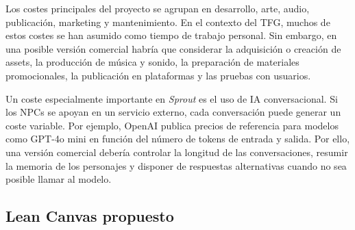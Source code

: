 \documentclass[12pt,twoside,titlepage]{report}
\begin{document}
Los costes principales del proyecto se agrupan en desarrollo, arte, audio, publicación, marketing y mantenimiento. En el contexto del TFG, muchos de estos costes se han asumido como tiempo de trabajo personal. Sin embargo, en una posible versión comercial habría que considerar la adquisición o creación de assets, la producción de música y sonido, la preparación de materiales promocionales, la publicación en plataformas y las pruebas con usuarios.

Un coste especialmente importante en \textit{Sprout} es el uso de IA conversacional. Si los NPCs se apoyan en un servicio externo, cada conversación puede generar un coste variable. Por ejemplo, OpenAI publica precios de referencia para modelos como GPT-4o mini en función del número de tokens de entrada y salida. Por ello, una versión comercial debería controlar la longitud de las conversaciones, resumir la memoria de los personajes y disponer de respuestas alternativas cuando no sea posible llamar al modelo.

\subsection{Lean Canvas propuesto}
\end{document}
